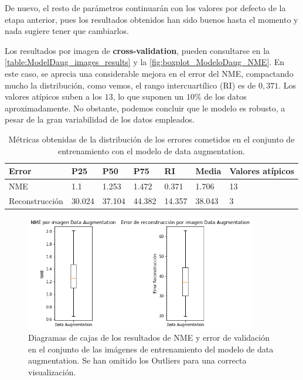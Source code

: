         \medskip

        \noindent De nuevo, el resto de parámetros continuarán con los valores por defecto de la etapa anterior, pues los resultados obtenidos han sido buenos hasta el momento y nada sugiere tener que cambiarlos.

        \medskip

        \noindent Los resultados por imagen de \textbf{cross-validation}, pueden consultarse en la \autoref{table:ModelDaug_images_results} y la \autoref{fig:boxplot_ModeloDaug_NME}. En este caso, se aprecia una considerable mejora en el error del NME, compactando mucho la distribución, como vemos, el rango intercuartílico (RI) es de $0,371$. Los valores atípicos suben a los $13$, lo que suponen un $10\%$ de los datos aproximadamente. No obstante, podemos concluir que le modelo es robusto, a pesar de la gran variabilidad de los datos empleados.

        \begin{table}[!ht]
            \centering
            \caption{Métricas obtenidas de la distribución de los errores cometidos en el conjunto de entrenamiento con el modelo de data augmentation.}
            \begin{tabular}{|l|l|l|l|l|l|l|}
            \hline
            \cellcolor{gray!25}\textbf{Error} & \cellcolor{gray!25}\textbf{P25} & \cellcolor{gray!25}\textbf{P50} & \cellcolor{gray!25}\textbf{P75} & \cellcolor{gray!25}\textbf{RI} & \cellcolor{gray!25}\textbf{Media} & \cellcolor{gray!25}\textbf{Valores atípicos}\\ \hline
                NME & 1.1 & 1.253 & 1.472 & 0.371 & 1.706 & 13 \\ \hline
                Reconstrucción & 30.024 & 37.104 & 44.382 & 14.357 & 38.043 & 3 \\ \hline
            \end{tabular}
            \label{table:ModelDaug_images_results}
        \end{table}

        \begin{figure}[H]
            \centering
            \includegraphics[width=0.9\textwidth]{img/boxplot_daug.png}
            \caption{Diagramas de cajas de los resultados de NME y error de validación en el conjunto de las imágenes de entrenamiento del modelo de data augmentation. Se han omitido los Outliers para una correcta visualización.}
            \label{fig:boxplot_ModeloDaug_NME}
        \end{figure}

